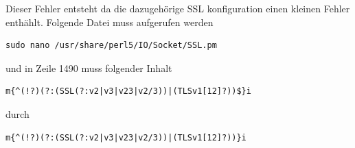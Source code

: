 \documentclass[11pt,a4paper]{article} %
\begin{document}
Dieser Fehler entsteht da die dazugeh\"orige SSL konfiguration einen kleinen Fehler enth\"ahlt.
Folgende Datei muss aufgerufen werden
\begin{frame}

\begin{lstlisting}
sudo nano /usr/share/perl5/IO/Socket/SSL.pm

\end{lstlisting}
\end{frame}

und in Zeile 1490 muss folgender Inhalt
\begin{frame}

\begin{lstlisting}
m{^(!?)(?:(SSL(?:v2|v3|v23|v2/3))|(TLSv1[12]?))$}i

\end{lstlisting}
\end{frame}

durch
\begin{frame}

\begin{lstlisting}
m{^(!?)(?:(SSL(?:v2|v3|v23|v2/3))|(TLSv1[12]?))}i

\end{lstlisting}
\end{frame}
\end{document}
